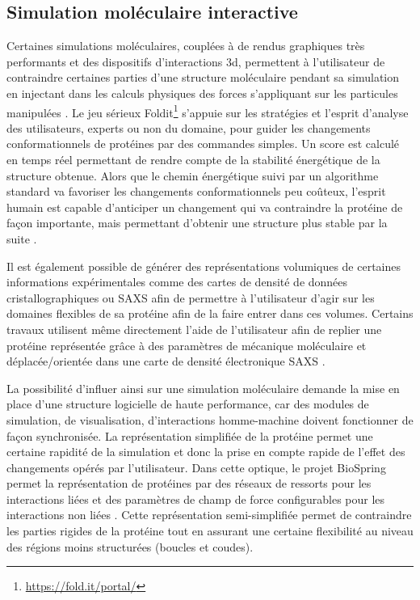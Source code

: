 \subsection{Simulation moléculaire interactive} \label{simu_interactive}

Certaines simulations moléculaires, couplées à de rendus graphiques très performants et des dispositifs d'interactions 3d, permettent à l'utilisateur de contraindre certaines parties d'une structure moléculaire pendant sa simulation en injectant dans les calculs physiques des forces s'appliquant sur les particules manipulées \cite{bolopion_comparing_2010}. Le jeu sérieux Foldit\footnote{\url{https://fold.it/portal/}} s'appuie sur les stratégies et l'esprit d'analyse des utilisateurs, experts ou non du domaine, pour guider les changements conformationnels de protéines par des commandes simples. Un score est calculé en temps réel permettant de rendre compte de la stabilité énergétique de la structure obtenue. Alors que le chemin énergétique suivi par un algorithme standard va favoriser les changements conformationnels peu coûteux, l'esprit humain est capable d'anticiper un changement qui va contraindre la protéine de façon importante, mais permettant d'obtenir une structure plus stable par la suite \cite{khatib2011crystal}.

Il est également possible de générer des représentations volumiques de certaines informations expérimentales comme des cartes de densité de données cristallographiques ou SAXS afin de permettre à l'utilisateur d'agir sur les domaines flexibles de sa protéine afin de la faire entrer dans ces volumes. Certains travaux utilisent même directement l'aide de l'utilisateur afin de replier une protéine représentée grâce à des paramètres de mécanique moléculaire et déplacée/orientée dans une carte de densité électronique SAXS \cite{molza2014innovative}.

La possibilité d'influer ainsi sur une simulation moléculaire demande la mise en place d'une structure logicielle de haute performance, car des modules de simulation, de  visualisation, d'interactions homme-machine doivent fonctionner de façon synchronisée.
La représentation simplifiée de la protéine permet une certaine rapidité de la simulation et donc la prise en compte rapide de l'effet des changements opérés par l'utilisateur. Dans cette optique, le projet BioSpring permet la représentation de protéines par des réseaux de ressorts pour les interactions liées et des paramètres de champ de force configurables pour les interactions non liées \cite{ferey2012biospring}. Cette représentation semi-simplifiée permet de contraindre les parties rigides de la protéine tout en assurant une certaine flexibilité au niveau des régions moins structurées (boucles et coudes).

